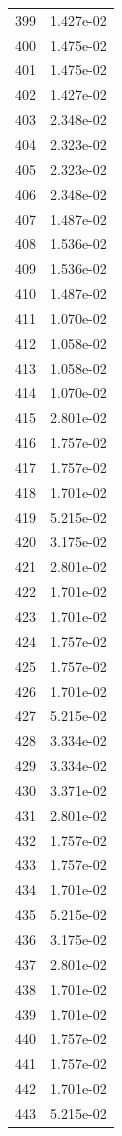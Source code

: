 \documentclass[12pt]{article}
\begin{document}
\begin{longtable}{@{}cc@{}}
399 & 1.427e-02 \\
400 & 1.475e-02 \\
401 & 1.475e-02 \\
402 & 1.427e-02 \\
403 & 2.348e-02 \\
404 & 2.323e-02 \\
405 & 2.323e-02 \\
406 & 2.348e-02 \\
407 & 1.487e-02 \\
408 & 1.536e-02 \\
409 & 1.536e-02 \\
410 & 1.487e-02 \\
411 & 1.070e-02 \\
412 & 1.058e-02 \\
413 & 1.058e-02 \\
414 & 1.070e-02 \\
415 & 2.801e-02 \\
416 & 1.757e-02 \\
417 & 1.757e-02 \\
418 & 1.701e-02 \\
419 & 5.215e-02 \\
420 & 3.175e-02 \\
421 & 2.801e-02 \\
422 & 1.701e-02 \\
423 & 1.701e-02 \\
424 & 1.757e-02 \\
425 & 1.757e-02 \\
426 & 1.701e-02 \\
427 & 5.215e-02 \\
428 & 3.334e-02 \\
429 & 3.334e-02 \\
430 & 3.371e-02 \\
431 & 2.801e-02 \\
432 & 1.757e-02 \\
433 & 1.757e-02 \\
434 & 1.701e-02 \\
435 & 5.215e-02 \\
436 & 3.175e-02 \\
437 & 2.801e-02 \\
438 & 1.701e-02 \\
439 & 1.701e-02 \\
440 & 1.757e-02 \\
441 & 1.757e-02 \\
442 & 1.701e-02 \\
443 & 5.215e-02 \\

\end{longtable}
\end{document}
